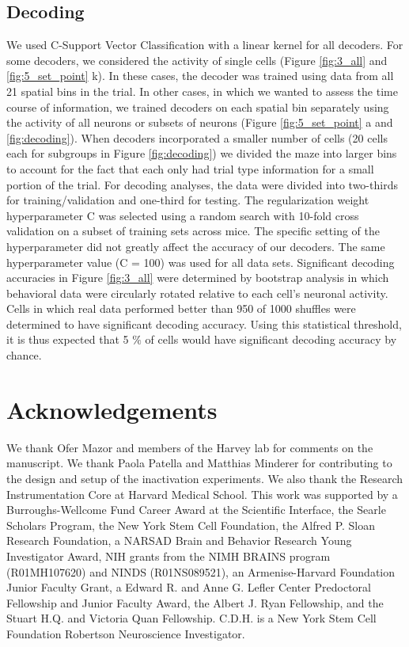 \subsection{Decoding}\label{methods:decoding}
We used C-Support Vector Classification with a linear kernel for all decoders. For some decoders, we considered the activity of single cells (Figure \ref{fig:3_all} and \ref{fig:5_set_point} k). In these cases, the decoder was trained using data from all 21 spatial bins in the trial. In other cases, in which we wanted to assess the time course of information, we trained decoders on each spatial bin separately using the activity of all neurons or subsets of neurons (Figure \ref{fig:5_set_point} a and \ref{fig:decoding}). When decoders incorporated a smaller number of cells (20 cells each for subgroups in Figure \ref{fig:decoding}) we divided the maze into larger bins to account for the fact that each only had trial type information for a small portion of the trial. For decoding analyses, the data were divided into two-thirds for training/validation and one-third for testing. The regularization weight hyperparameter C was selected using a random search with 10-fold cross validation on a subset of training sets across mice. The specific setting of the hyperparameter did not greatly affect the accuracy of our decoders. The same hyperparameter value (C = 100) was used for all data sets. Significant decoding accuracies in Figure \ref{fig:3_all} were determined by bootstrap analysis in which behavioral data were circularly rotated relative to each cell's neuronal activity. Cells in which real data performed better than 950 of 1000 shuffles were determined to have significant decoding accuracy. Using this statistical threshold, it is thus expected that 5 $\%$  of cells would have significant decoding accuracy by chance.

\section{Acknowledgements}
We thank Ofer Mazor and members of the Harvey lab for comments on the manuscript. We thank Paola Patella and Matthias Minderer for contributing to the design and setup of the inactivation experiments. We also thank the Research Instrumentation Core at Harvard Medical School. This work was supported by a Burroughs-Wellcome Fund Career Award at the Scientific Interface, the Searle Scholars Program, the New York Stem Cell Foundation, the Alfred P. Sloan Research Foundation, a NARSAD Brain and Behavior Research Young Investigator Award, NIH grants from the NIMH BRAINS program (R01MH107620) and NINDS (R01NS089521), an Armenise-Harvard Foundation Junior Faculty Grant, a Edward R. and Anne G. Lefler Center Predoctoral Fellowship and Junior Faculty Award, the Albert J. Ryan Fellowship, and the Stuart H.Q. and Victoria Quan Fellowship. C.D.H. is a New York Stem Cell Foundation Robertson Neuroscience Investigator. 